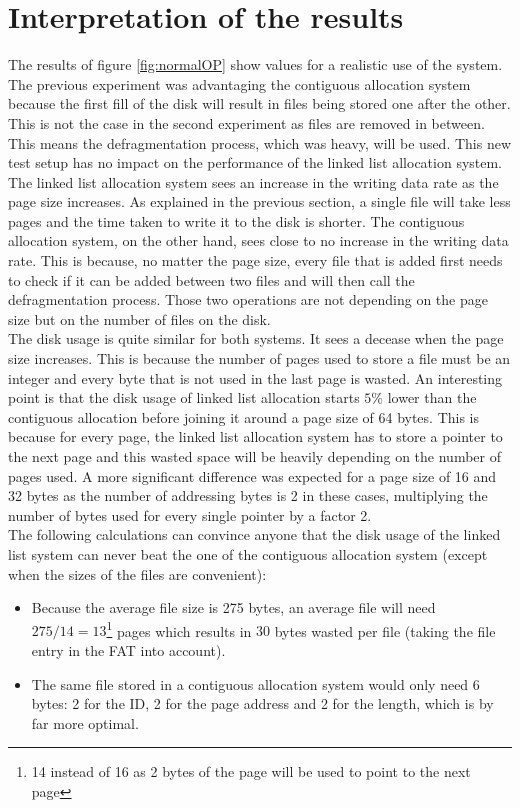 \documentclass[10pt,a4paper]{ULBreport}
\begin{document}
\section{Interpretation of the results}
The results of figure \ref{fig:normalOP} show values for a realistic use of the system. The previous experiment was advantaging the contiguous allocation system because the first fill of the disk will result in files being stored one after the other. This is not the case in the second experiment as files are removed in between. This means the defragmentation process, which was heavy, will be used. This new test setup has no impact on the performance of the linked list allocation system.\\
The linked list allocation system sees an increase in the writing data rate as the page size increases. As explained in the previous section, a single file will take less pages and the time taken to write it to the disk is shorter. The contiguous allocation system, on the other hand, sees close to no increase in the writing data rate. This is because, no matter the page size, every file that is added first needs to check if it can be added between two files and will then call the defragmentation process. Those two operations are not depending on the page size but on the number of files on the disk. \\
The disk usage is quite similar for both systems. It sees a decease when the page size increases. This is because the number of pages used to store a file must be an integer and every byte that is not used in the last page is wasted. An interesting point is that the disk usage of linked list allocation starts $5\%$ lower than the contiguous allocation before joining it around a page size of 64 bytes. This is because for every page, the linked list allocation system has to store a pointer to the next page and this wasted space will be heavily depending on the number of pages used. A more significant difference was expected for a page size of 16 and 32 bytes as the number of addressing bytes is 2 in these cases, multiplying the number of bytes used for every single pointer by a factor 2. \\
The following calculations can convince anyone that the disk usage of the linked list system can never beat the one of the contiguous allocation system (except when the sizes of the files are convenient):
\begin{itemize}
    \item Because the average file size is 275 bytes, an average file will need $275/14 = 13$\footnote{14 instead of 16 as 2 bytes of the page will be used to point to the next page} pages which results in $30$ bytes wasted per file (taking the file entry in the FAT into account).
    \item The same file stored in a contiguous allocation system would only need $6$ bytes: 2 for the ID, 2 for the page address and 2 for the length, which is by far more optimal. 
\end{itemize}
\end{document}
